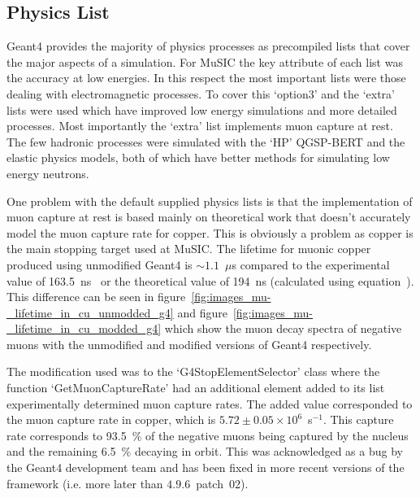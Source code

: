 \subsection{Physics List} %
\label{sec:physics_list}
Geant4 provides the majority of physics processes as precompiled lists that cover the major aspects of a simulation. For MuSIC the key attribute of each list was the accuracy at low energies. In this respect the most important lists were those dealing with electromagnetic processes. To cover this `option3' and the `extra' lists were used which have improved low energy simulations and more detailed processes. Most importantly the `extra' list implements muon capture at rest. The few hadronic processes were simulated with the `HP' QGSP-BERT and the elastic physics models, both of which have better methods for simulating low energy neutrons.

One problem with the default supplied physics lists is that the implementation of muon capture at rest is based mainly on theoretical work that doesn't accurately model the muon capture rate for copper. This is obviously a problem as copper is the main stopping target used at MuSIC. The lifetime for muonic copper produced using unmodified Geant4 is \(\sim1.1\)~\(\mu\)s compared to the experimental value of 163.5~ns~\cite{suzuki_mu_capture_rates} or the theoretical value of 194~ns (calculated using equation~\cite{eq:primakoff_and_goulard}). This difference can be seen in figure~\ref{fig:images_mu-_lifetime_in_cu_unmodded_g4} and figure~\ref{fig:images_mu-_lifetime_in_cu_modded_g4} which show the muon decay spectra of negative muons with the unmodified and modified versions of Geant4 respectively.

The modification used was to the `G4StopElementSelector' class where the function `GetMuonCaptureRate' had an additional element added to its list experimentally determined muon capture rates. The added value corresponded to the muon capture rate in copper, which is \(5.72\pm0.05\times10^6\)~s\(^{-1}\). This capture rate corresponds to 93.5~\% of the negative muons being captured by the nucleus and the remaining 6.5~\% decaying in orbit. This was acknowledged as a bug by the Geant4 development team and has been fixed in more recent versions of the framework (i.e. more later than \(4.9.6\)~patch~02).

